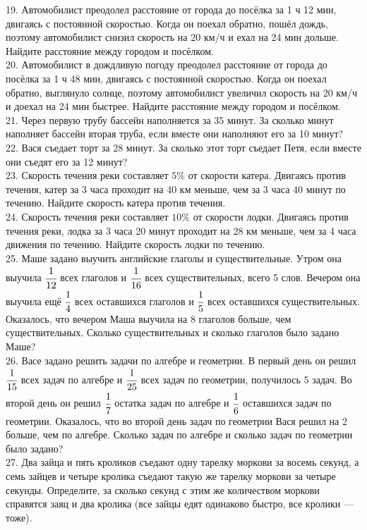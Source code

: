 19. Автомобилист преодолел расстояние от города до посёлка за 1 ч 12 мин, двигаясь с постоянной скоростью. Когда он поехал обратно, пошёл дождь, поэтому автомобилист снизил скорость на 20 км/ч и ехал на 24 мин дольше. Найдите расстояние между городом и посёлком.\\
20. Автомобилист в дождливую погоду преодолел расстояние от города до посёлка за 1 ч 48 мин, двигаясь с постоянной скоростью. Когда он поехал обратно, выглянуло солнце, поэтому автомобилист увеличил скорость на 20 км/ч и доехал на 24 мин быстрее. Найдите расстояние между городом и посёлком.\\
21. Через первую трубу бассейн наполняется за 35 минут. За сколько минут наполняет бассейн вторая труба, если вместе они наполняют его за 10 минут?\\
22. Вася съедает торт за 28 минут. За сколько этот торт съедает Петя, если вместе они съедят его за 12 минут?\\
23. Скорость течения реки составляет $5\%$ от скорости катера. Двигаясь против течения, катер за 3 часа проходит на 40 км меньше, чем за 3 часа 40 минут по течению. Найдите скорость катера против течения.\\
24. Скорость течения реки составляет $10\%$ от скорости лодки. Двигаясь против течения реки, лодка за 3 часа 20 минут проходит на 28 км меньше, чем за 4 часа движения по течению. Найдите скорость лодки по течению.\\
25. Маше задано выучить английские глаголы и существительные. Утром она выучила $\cfrac{1}{12}$ всех глаголов и $\cfrac{1}{16}$ всех существительных, всего 5 слов. Вечером она выучила ещё $\cfrac{1}{4}$ всех оставшихся глаголов и $\cfrac{1}{5}$ всех оставшихся существительных. Оказалось, что вечером Маша выучила на 8 глаголов больше, чем существительных. Сколько существительных и сколько глаголов было задано Маше?\\
26. Васе задано решить задачи по алгебре и геометрии. В первый день он решил $\cfrac{1}{15}$ всех задач по алгебре и $\cfrac{1}{25}$ всех задач по геометрии, получилось 5 задач. Во второй день он решил $\cfrac{1}{7}$ остатка задач по алгебре и $\cfrac{1}{6}$ оставшихся задач по геометрии. Оказалось, что во второй день задач по геометрии Вася решил на 2 больше, чем по алгебре. Сколько задач по алгебре и сколько задач по геометрии было задано?\\
27. Два зайца и пять кроликов съедают одну тарелку моркови за восемь секунд, а семь зайцев и четыре кролика съедают такую же тарелку моркови за четыре секунды. Определите, за сколько секунд с этим же количеством моркови справятся заяц и два кролика (все зайцы едят одинаково быстро, все кролики --- тоже).\\
